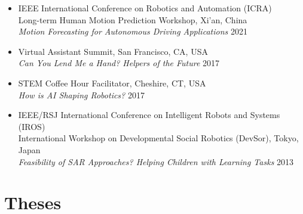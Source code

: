 \documentclass[10pt,letterpaper]{article}
\newcommand{\thing}[2]{{#1} \hfill {#2}}
\begin{document}
\begin{itemize}%

\item \thing{IEEE International Conference on Robotics and Automation (ICRA) \\ Long-term Human Motion Prediction Workshop, Xi'an, China \\ \it Motion Forecasting for Autonomous Driving Applications}{2021}
\item \thing{Virtual Assistant Summit, San Francisco, CA, USA \\ \it Can You Lend Me a Hand? Helpers of the Future}{2017}
\item \thing{STEM Coffee Hour Facilitator, Cheshire, CT, USA \\ \it How is AI Shaping Robotics?}{2017}
\item \thing{IEEE/RSJ International Conference on Intelligent Robots and Systems (IROS) \\ International Workshop on Developmental Social Robotics (DevSor), Tokyo, Japan \\ \it Feasibility of SAR Approaches? Helping Children with Learning Tasks}{2013}

\end{itemize}


\section{Theses}
\printbibliography[heading=none,keyword=phd_thesis,omitnumbers=true,prefixnumbers={Ph.D. Thesis}]
\printbibliography[heading=none,keyword=ma_thesis,omitnumbers=true,prefixnumbers={Master's Thesis}]
\end{document}
